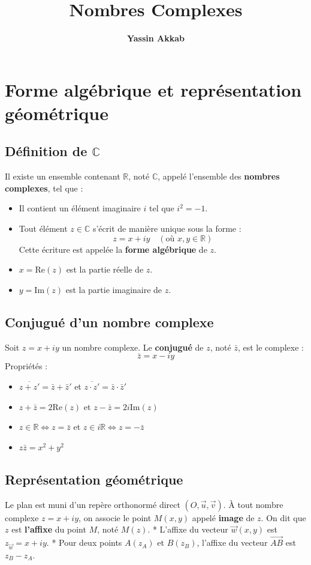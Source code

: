 \documentclass{article}
\title{\textbf{Nombres Complexes}}
\author{\textbf{Yassin Akkab}}
\begin{document}
	
	\maketitle
	\tableofcontents
	\newpage
	
	\section{Forme algébrique et représentation géométrique}
	
	\subsection{Définition de $\mathbb{C}$}
	Il existe un ensemble contenant $\mathbb{R}$, noté $\mathbb{C}$, appelé l'ensemble des \textbf{nombres complexes}, tel que :
	\begin{itemize}
		\item Il contient un élément imaginaire $i$ tel que $i^2 = -1$.
		\item Tout élément $z \in \mathbb{C}$ s'écrit de manière unique sous la forme :
		\[ z = x + iy \quad (\text{où } x, y \in \mathbb{R}) \]
		Cette écriture est appelée la \textbf{forme algébrique} de $z$.
		\item $x = \text{Re}(z)$ est la partie réelle de $z$.
		\item $y = \text{Im}(z)$ est la partie imaginaire de $z$.
	\end{itemize}
	
	\subsection{Conjugué d'un nombre complexe}
	Soit $z = x + iy$ un nombre complexe. Le \textbf{conjugué} de $z$, noté $\bar{z}$, est le complexe :
	\[ \bar{z} = x - iy \]
	Propriétés :
	\begin{itemize}
		\item $\overline{z + z'} = \bar{z} + \bar{z}'$ et $\overline{z \cdot z'} = \bar{z} \cdot \bar{z}'$
		\item $z + \bar{z} = 2\text{Re}(z)$ et $z - \bar{z} = 2i\text{Im}(z)$
		\item $z \in \mathbb{R} \iff z = \bar{z}$ et $z \in i\mathbb{R} \iff z = -\bar{z}$
		\item $z \bar{z} = x^2 + y^2$
	\end{itemize}
	
	\subsection{Représentation géométrique}
	Le plan est muni d'un repère orthonormé direct $(O, \vec{u}, \vec{v})$.
	À tout nombre complexe $z = x + iy$, on associe le point $M(x, y)$ appelé \textbf{image} de $z$. On dit que $z$ est \textbf{l'affixe} du point $M$, noté $M(z)$.
	* L'affixe du vecteur $\vec{w}(x, y)$ est $z_{\vec{w}} = x + iy$.
	* Pour deux points $A(z_A)$ et $B(z_B)$, l'affixe du vecteur $\overrightarrow{AB}$ est $z_B - z_A$.
	
\end{document}
